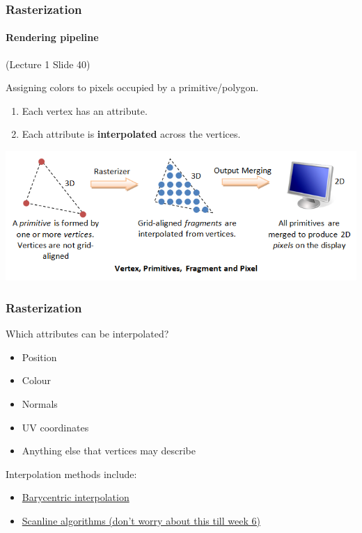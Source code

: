 \documentclass{beamer}
\begin{document}
\begin{frame}
    \frametitle{Rasterization}
    \framesubtitle{Rendering pipeline}

    (Lecture 1 Slide 40)

    Assigning colors to pixels occupied by a primitive/polygon.

    \begin{enumerate}
        \item Each vertex has an attribute.
        \item Each attribute is \textbf{interpolated} across the vertices.
    \end{enumerate}

    \vspace{1em}

    {\begin{center} \includegraphics[scale=0.5]{q5-Graphics3D_VertexFragment.png} \end{center}}

\end{frame}

\begin{frame}
    \frametitle{Rasterization}

    Which attributes can be interpolated?
    \begin{itemize}
        \item Position
        \item Colour
        \item Normals
        \item UV coordinates
        \item Anything else that vertices may describe
    \end{itemize}

    Interpolation methods include:
    \begin{itemize}
        \item \href{https://www.scratchapixel.com/lessons/3d-basic-rendering/ray-tracing-rendering-a-triangle/barycentric-coordinates.html}{Barycentric interpolation}
        \item \href{https://en.wikipedia.org/wiki/Scanline_rendering}{Scanline algorithms (don't worry about this till week 6)}
    \end{itemize}

\end{frame}
\end{document}
